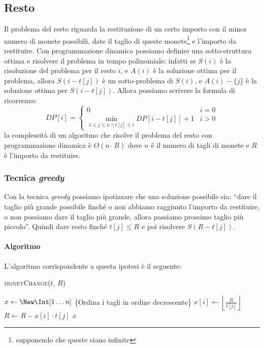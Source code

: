     \subsection{Resto}
        Il problema del resto riguarda la restituzione di un certo importo con il minor numero di monete possibili, date il taglio di queste monete\footnote{supponendo che queste siano infinite} e l'importo da restituire. 
        Con programmazione dinamica possiamo definire una sotto-struttura ottima e risolvere il problema in tempo polinomiale: infatti se $S(i)$ è la risoluzione del problema per il resto $i$, e $A(i)$ è la soluzione ottima per il problema, allora $S(i-t[j])$ è un sotto-problema di $S(i)$, e $A(i) - \{j\}$ è la soluzione ottima per $S(i-t[j])$. Allora possiamo scrivere la formula di ricorrenza:
        $$
            DP[i] = \begin{cases}
                0 & i = 0\\
                \min_{1\leq j \leq n \land t[j] \leq i} DP[i-t[j]] + 1 & i > 0
            \end{cases}
        $$
        la complessità di un algoritmo che risolve il problema del resto con programmazione dinamica è $O(n \cdot R)$ dove $n$ è il numero di tagli di monete e $R$ è l'importo da restituire.
        \subsubsection{Tecnica \textit{greedy}}
            Con la tecnica \textit{greedy} possiamo ipotizzare che una soluzione possibile sia: ``dare il taglio più grande possibile finché o non abbiamo raggiunto l'importo da restituire, o non possiamo dare il taglio più grande, allora passiamo prossimo taglio più piccolo''. Quindi dare resto finché $t[j] \leq R$ e poi risolvere $S(R-t[j])$.
            \paragraph{Algoritmo}
                L'algoritmo corrispondente a questa ipotesi è il seguente:
                \begin{algorithm}[H]
                    \caption{\Int[] \textsc{moneyChange}(\Int[] $t$, \Int $R$)}
                    \begin{algorithmic}
                        \State \Int[] $x \gets \New \Int[1 \ldots n]$
                        \State \{Ordina i tagli in ordine decrescente\}
                            \State $x[i] \gets \left\lfloor\frac{R}{t[j]}\right\rfloor$
                            \State $R \gets R - x[i] \cdot t[j]$
                        \EndFor
                        \State \Return $x$
                    \end{algorithmic}
                \end{algorithm}
